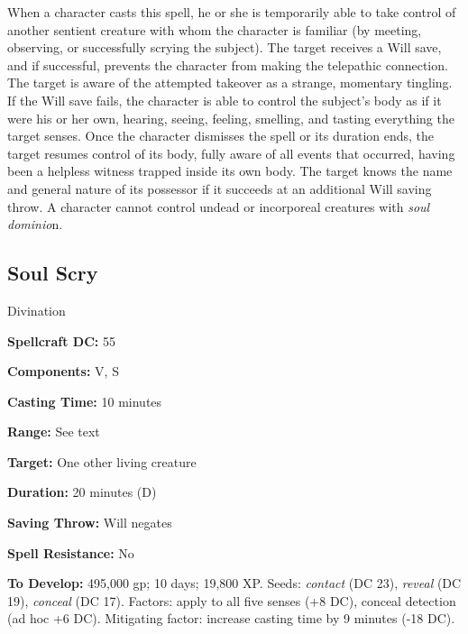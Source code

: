 \documentclass{article}
\begin{document}
When a character casts this spell, he or she is temporarily able to take control 
of another sentient creature with whom the character is familiar (by meeting, observing, 
or successfully scrying the subject). The target receives a Will save, and if successful, 
prevents the character from making the telepathic connection. The target is aware 
of the attempted takeover as a strange, momentary tingling. If the Will save fails, 
the character is able to control the subject's body as if it were his or her own, 
hearing, seeing, feeling, smelling, and tasting everything the target senses. Once 
the character dismisses the spell or its duration ends, the target resumes control 
of its body, fully aware of all events that occurred, having been a helpless witness 
trapped inside its own body. The target knows the name and general nature of its 
possessor if it succeeds at an additional Will saving throw. A character cannot 
control undead or incorporeal creatures with \textit{soul dominio}n.

\vspace{12pt}
\subsection*{Soul Scry }

Divination 

\textbf{Spellcraft DC:} 55 

\textbf{Components:} V, S 

\textbf{Casting Time:} 10 minutes 

\textbf{Range:} See text 

\textbf{Target:} One other living creature 

\textbf{Duration:} 20 minutes (D) 

\textbf{Saving Throw:} Will negates 

\textbf{Spell Resistance:} No 

\textbf{To Develop:} 495,000 gp; 10 days; 19,800 XP. Seeds: \textit{contact }(DC 
23), \textit{reveal }(DC 19), \textit{conceal }(DC 17). Factors: apply to all five 
senses (+8 DC), conceal detection (ad hoc +6 DC). Mitigating factor: increase casting 
time by 9 minutes (-18 DC). 
\end{document}
